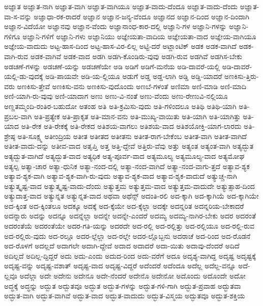 {ಅಜ್ಞಾತ
ಅಜ್ಞಾತ-ನಾಗಿ
ಅಜ್ಞಾತ-ವಾಗಿ
ಅಜ್ಞಾತ-ವಾಗಿಯೂ
ಅಜ್ಞಾತ-ವಾದು-ದೆಂದೂ
ಅಜ್ಞಾತ-ವಾದು-ದೆಂದು
ಅಜ್ಞಾತ-ವಾ-ಸ-ವನ್ನು
ಅಜ್ಞಾಧಾ-ರಕ-ರಾದರೆ
ಅಜ್ಞಾನ
ಅಜ್ಞಾನ-ಜನ್ಯ-ವೆಂದೂ
ಅಜ್ಞಾನದ
ಅಜ್ಞಾನ-ದಿಂದ
ಅಜ್ಞಾನ-ದಿಂದಾಗಿ
ಅಜ್ಞಾನ-ವಿದೆಯೋ
ಅಜ್ಞಾನವು
ಅಜ್ಞಾನ-ವೆಂದು
ಅಜ್ಞಾನಾಂಧ-ಕಾರ-ದಲ್ಲಿ
ಅಜ್ಞಾನಿ-ಗಳ
ಅಜ್ಞಾನಿ-ಗಳನ್ನು
ಅಜ್ಞಾನಿ-ಗಳಿಗೂ
ಅಜ್ಞಾನಿ-ಗಳಿಗೆ
ಅಜ್ಞಾನಿ-ಗಳು
ಅಜ್ಞಾನಿಯು
ಅಜ್ಞೇಯತಾ-ವಾದಿಯ
ಅಜ್ಞೇಯತಾ-ವಾದ
ಅಜ್ಞೇಯ-ವಾಗಿಯೂ
ಅಜ್ಞೇಯ-ವಾದುದು
ಅಟ್ಟ-ಹಾಸ-ದಿಂದ
ಅಟ್ಟ-ಹಾಸ-ವಿರ-ಲಿಲ್ಲ
ಅಟ್ಟಿ-ದರೆ
ಅಟ್ಲಾಂಟಿಕ್
ಅಡಕ
ಅಡಕ-ವಾಗಿದೆ
ಅಡಕ-ವಾಗಿ-ರುವ
ಅಡಕ-ವಾಗಿವೆ
ಅಡಕ-ವಾದ
ಅಡಗಿ
ಅಡಗಿ-ಕೊಂಡಿರು-ವುವು
ಅಡಗಿ-ರುವ
ಅಡಗಿವೆ
ಅಡಗಿಸ-ಬೇಕು
ಅಡಚಣೆ-ಗಳನ್ನು
ಅಡಚಣೆ-ಯನ್ನು
ಅಡಚಣೆಯೇ
ಅಡಿ
ಅಡಿಗೆ
ಅಡಿಗೆ-ಮನೆಯ
ಅಡಿ-ದಾವರೆ-ಯಲ್ಲಿ
ಅಡಿ-ದಾವರೆ-ಯಲ್ಲಿ-ಡು-ವುದಕ್ಕೆ
ಅಡಿ-ಪಾಯವೇ
ಅಡಿ-ಯ-ಲ್ಲಿಯೂ
ಅಡುಗೆ
ಅಡ್ಡ
ಅಡ್ಡ-ಲಾಗಿ
ಅಡ್ಡಿ
ಅಡ್ಡಿ-ಯಾದರೆ
ಅಣಕಿಸು-ತ್ತಿರು-ವರು
ಅಣಕಿಸು-ತ್ತೇವೆ
ಅಣಕಿಸು-ವನು
ಅಣಕಿಸು-ವುದೊಂದು
ಅಣಬೆ-ಗಳಂತೆ
ಅಣಿಮಾ
ಅಣಿ-ಮಾಡಿ
ಅಣಿ-ಮಾದಿ
ಅಣಿ-ಯಾಗಿ-ರು-ವುವು
ಅಣಿ-ಯಾದಾಗ
ಅಣು
ಅಣು-ವಿ-ನಂತೆ
ಅಣು-ವೆಂದು
ಅಣು-ರೇಣುವಿ-ನಲ್ಲಿಯೂ
ಅಣ್ಣತಮ್ಮಂದಿ-ರಂತಿರ-ಬಹುದೋ
ಅತಂಹ
ಅತಿ
ಅತಿ-ಕ್ರಮಿಸು-ವುದು
ಅತಿ-ಗಳಿಂದಲೂ
ಅತಿಥಿ
ಅತಿಥಿ-ಯಾಗಿ
ಅತಿ-ಪ್ರಬಲ-ವಾಗಿ
ಅತಿ-ಪ್ರತ್ಯೇಕ
ಅತಿ-ಪ್ರಾಕೃತ
ಅತಿ-ಮಾನ-ವನು
ಅತಿ-ಮುಖ್ಯ-ವಾಯಿತು
ಅತಿ-ಯಾಗಿ
ಅತಿ-ಯಾಗಿತ್ತು
ಅತಿ-ಯಾದ
ಅತಿ-ರೇಕ
ಅತಿ-ರೇಕಕ್ಕೆ
ಅತಿ-ರೇಕದ
ಅತಿಶಯ-ವಾಗಲು
ಅತಿಶಯ-ವಾದ
ಅತಿಶಯೋಕ್ತಿ-ಯಾಗ-ಲಾರದು
ಅತಿ-ಶ್ರೇಷ್ಠ
ಅತಿ-ಸೂಕ್ಷ್ಮ
ಅತೀಂದ್ರಿಯ
ಅತೀತ
ಅತೀತದ
ಅತೀತನು
ಅತೀತ-ರಾಗ-ಬೇಕೆಂಬ
ಅತೀತ-ವಾಗಿ
ಅತೀತ-ವಾಗಿದೆ
ಅತೀತ-ವಾದು-ದನ್ನು
ಅತೀವ-ವಾದ
ಅತೃಪ್ತಿ
ಅತ್ತ
ಅತ್ತಿ-ದ್ದೇವೆ
ಅತ್ತಿರು-ವೆವು
ಅತ್ತು
ಅತ್ಯಂತ
ಅತ್ಯಂತ-ವಾಗಿ
ಅತ್ಯದ್ಭುತ
ಅತ್ಯದ್ಭುತ-ವಾಗಿದೆ
ಅತ್ಯದ್ಭುತ-ವಾದ
ಅತ್ಯಧಿಕ
ಅತ್ಯ-ಪೂರ್ವ-ವಾದ
ಅತ್ಯಮೂಲ್ಯ
ಅತ್ಯಮೂಲ್ಯ-ವಾದ
ಅತ್ಯಮೋಘ
ಅತ್ಯಲ್ಪ
ಅತ್ಯಾ-ಚಾರ
ಅತ್ಯಾ-ಧುನಿಕ
ಅತ್ಯಾ-ನಂದ-ದಲ್ಲಿ
ಅತ್ಯಾ-ನಂದ-ವಾಗಿದೆ
ಅತ್ಯಾ-ನಂದ-ವಾಗು-ತ್ತದೆ
ಅತ್ಯಾವ-ಶ್ಯಕ
ಅತ್ಯಾವ-ಶ್ಯಕ-ವಾಗಿ
ಅತ್ಯಾವ-ಶ್ಯಕ-ವಾಗಿ-ರು-ವುದು
ಅತ್ಯಾವ-ಶ್ಯಕ-ವಾದ
ಅತ್ಯಾವ-ಶ್ಯಕ-ವಾದುದೆ
ಅತ್ಯುಚ್ಚ-ನಾಗಿ
ಅತ್ಯುತ್ಕೃಷ್ಟ-ವಾದ
ಅತ್ಯುತ್ಕೃಷ್ಟ-ವಾದು-ದೆಂದು
ಅತ್ಯುತ್ತಮ
ಅತ್ಯುತ್ತಮ-ವಾದ
ಅತ್ಯುತ್ತಮ-ವಾದುದೇ
ಅತ್ಯುತ್ಸಾಹ-ದಿಂದ
ಅತ್ಯುದಾತ್ತ-ವಾದ
ಅತ್ಯುನ್ನತ
ಅತ್ಯುನ್ನತ-ವಾದ
ಅಥವಾ
ಅಥೆನ್ಸ್
ಅದಂತಿ-ರಲಿ
ಅದ-ಕ್ಕಾಗಿ
ಅದ-ಕ್ಕಾಗಿಯೆ
ಅದ-ಕ್ಕಾಗಿಯೇ
ಅದ-ಕ್ಕಿಂತ
ಅದ-ಕ್ಕಿಂತಲೂ
ಅದಕ್ಕೂ
ಅದಕ್ಕೆ
ಅದ-ಕ್ಕೆಯೇ
ಅದ-ಕ್ಕೆಲ್ಲಾ
ಅದಕ್ಕೇ
ಅದನ್ನರಿತ
ಅದನ್ನರಿಯ-ಬೇಕಾದರೆ
ಅದನ್ನಾರು
ಅದನ್ನು
ಅದನ್ನೂ
ಅದನ್ನೆಲ್ಲಾ
ಅದನ್ನೇ
ಅದನ್ನೇ-ಎಂದರೆ
ಅದಮ್ಯ
ಅದಮ್ಯ-ನಾಗಿರ-ಬೇಕು
ಅದರ
ಅದರಂತೆ
ಅದರಂತೆಯೆ
ಅದರಂತೆಯೇ
ಅದರ-ಗತಿ-ಯನ್ನು
ಅದರದೇ
ಅದ-ರಲ್ಲಿ
ಅದ-ರಲ್ಲಿತ್ತು
ಅದ-ರಲ್ಲಿಯೂ
ಅದ-ರಲ್ಲಿ-ರುವ
ಅದ-ರಲ್ಲಿರು-ವುದು
ಅದ-ರಲ್ಲೂ
ಅದರ-ಲ್ಲೆಲ್ಲಾ
ಅದ-ರಲ್ಲೇ
ಅದರ-ಲ್ಲೊಬ್ಬನು
ಅದರಾಚೆ
ಅದ-ರಿಂದ
ಅದ-ರೊಡನೆ
ಅದ-ರೊಳಗೆ
ಅದಲ್ಲದೆ
ಅದಾಗಲೇ
ಅದಾಗಿ-ದ್ದೇವೆ
ಅದಾದ
ಅದಾದರೆ
ಅದಾ-ಯಿತು
ಅದಾವು-ದೆಂದರೆ
ಅದಿದೆ
ಅದಿಲ್ಲದೆ
ಅದಿಲ್ಲ-ದ್ದಿದ್ದರೆ
ಅದು
ಅದು-ಎಂದು
ಅದುದ-ರಿಂದ
ಅದು-ವರೆಗೆ
ಅದೂ
ಅದೃಶ್ಯ-ವಾಗಿದ್ದ
ಅದೃಷ್ಟ
ಅದೃಷ್ಟಕ್ಕೆ
ಅದೃಷ್ಟ-ವನ್ನು
ಅದೃಷ್ಟ-ವಶಾತ್
ಅದೃಷ್ಟ-ವಾದ
ಅದೃಷ್ಟ-ವಿದ್ದರೆ
ಅದೆಂದರೆ
ಅದೆಂದೂ
ಅದೆಲ್ಲ
ಅದೆಲ್ಲ-ವನ್ನೂ
ಅದೆ-ಲ್ಲವೂ
ಅದೆಲ್ಲಾ
ಅದೇ
ಅದೇನು
ಅದೇನೂ
ಅದೇ-ನೆಂದರೆ
ಅದೇನೊ
ಅದೇನೋ
ಅದೊಂದು
ಅದೊಂದೇ
ಅದೋ
ಅದ್ಧಕ್ಕೆ
ಅದ್ಧನ್ನು
ಅದ್ಬುತ
ಅದ್ಬುತವೂ
ಅದ್ಭುತ
ಅದ್ಭುತ-ಗಳನ್ನು
ಅದ್ಭುತ-ಗಳಿ-ಗಾಗಿ
ಅದ್ಭುತ-ಪ್ರವಾಹ
ಅದ್ಭುತವಾ
ಅದ್ಭುತ-ವಾಗಿ
ಅದ್ಭುತ-ವಾಗಿವೆ
ಅದ್ಭುತ-ವಾದ
ಅದ್ಭುತ-ವಾದುದು
ಅದ್ಭುತ-ವಿಸ್ಮಯ
ಅದ್ಭುತವೂ
ಅದ್ಭುತ-ಶಕ್ತಿಯ
}
